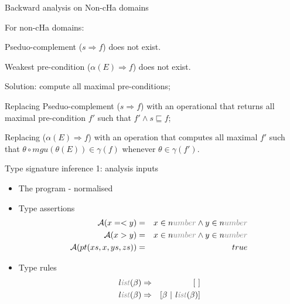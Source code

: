 \documentclass{beamer}
\newenvironment{tightitemize}{\begin{description}%
                          \setlength{\parskip 0pt}%
                          \setlength{\topsep 0pt}%
                          \setlength{\itemsep 2pt}%
                          \setlength{\partopsep 0pt}}%
                         {\end{description}}
\def\land{\wedge}
\def\tlist{{\it l\color{light}ist}}
\def\pspace{\vspace*{\fill}}
\begin{document}
\begin{frame}{Backward analysis on Non-cHa domains}
\vspace{\fill}

For non-cHa domains:
\begin{tightitemize}
    \item Pseduo-complement ($s \Rightarrow f$) does not exist.
    \item Weakest pre-condition ($\alpha(E)\Rightarrow f$) does not exist.
\end{tightitemize}

Solution: compute all maximal pre-conditions;
\begin{tightitemize}
    \item Replacing Pseduo-complement ($s \Rightarrow f$) with an
    operational that returns all maximal pre-condition $f'$ such
    that $f'\wedge s\sqsubseteq f$;
    \item Replacing ($\alpha(E)\Rightarrow f$) with an operation
    that computes all maximal $f'$ such that $\theta\circ
    mgu(\theta(E)) \in\gamma(f)$ whenever $\theta\in\gamma(f')$.
\end{tightitemize}

\vspace{\fill}
\end{frame}

\begin{frame}{Type signature inference 1: analysis inputs}

\pspace

\begin{itemize}
\item The program - normalised \item Type assertions
\begin{eqnarray*}
    \mathcal{A}(x=<y) &=& x\in{n\color{light}umber}\land y\in{n\color{light}umber}\\
    \mathcal{A}(x>y) &=& x\in{n\color{light}umber}\land y\in{n\color{light}umber}\\
    \mathcal{A}(pt(xs,x,ys,zs)) & = & true
\end{eqnarray*}

\item  Type rules
\begin{eqnarray*}
 \tlist(\beta) & \Rightarrow & [~] \\
 \tlist(\beta) & \Rightarrow & [\beta~|~\tlist(\beta)]
\end{eqnarray*}
\end{itemize}

\end{frame}
\end{document}
